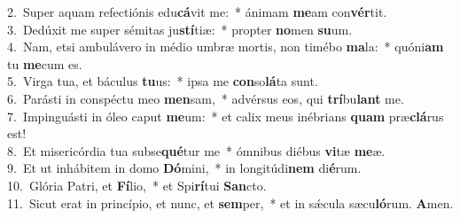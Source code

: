 {2.~}Super aquam refectiónis edu\textbf{cá}vit me:~* ánimam \textbf{me}am con\textbf{vér}tit.\\
{3.~}Dedúxit me super sémitas ju\textbf{stí}tiæ:~* propter \textbf{no}men \textbf{su}um.\\
{4.~}Nam, etsi ambulávero in médio umbræ mortis, non timébo \textbf{ma}la:~* quóni\textbf{am} tu \textbf{me}cum es.\\
{5.~}Virga tua, et báculus \textbf{tu}us:~* ipsa me \textbf{con}so\textbf{lá}ta sunt.\\
{6.~}Parásti in conspéctu meo \textbf{men}sam,~* advérsus eos, qui \textbf{trí}bu\textbf{lant} me.\\
{7.~}Impinguásti in óleo caput \textbf{me}um:~* et calix meus inébrians \textbf{quam} præ\textbf{clá}rus est!\\
{8.~}Et misericórdia tua subse\textbf{qué}tur me~* ómnibus diébus \textbf{vi}tæ \textbf{me}æ.\\
{9.~}Et ut inhábitem in domo \textbf{Dó}mini,~* in longitúdi\textbf{nem} di\textbf{é}rum.\\
{10.~}Glória Patri, et \textbf{Fí}lio,~* et Spi\textbf{rí}tui \textbf{San}cto.\\
{11.~}Sicut erat in princípio, et nunc, et \textbf{sem}per,~* et in sǽcula sæcu\textbf{ló}rum. \textbf{A}men.\\
